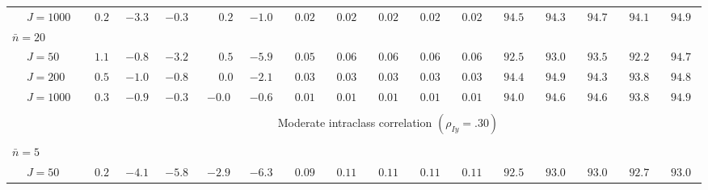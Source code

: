 \begin{sidewaystable}
\begin{threeparttable}
\begin{tabular}{llccccccccccccccc}
 & \nopagebreak $\;J=1000$  & $\phantom{-}0.2\phantom{0}$ & ${-}3.3\phantom{0}$ & ${-}0.3\phantom{0}$ & $\phantom{-}0.2\phantom{0}$ & ${-}1.0\phantom{0}$ & $\phantom{0}0.02\phantom{0}$ & $\phantom{0}0.02\phantom{0}$ & $\phantom{0}0.02\phantom{0}$ & $\phantom{0}0.02\phantom{0}$ & $\phantom{0}0.02\phantom{0}$ & $\phantom{0}94.5\phantom{0}$ & $\phantom{0}94.3\phantom{0}$ & $\phantom{0}94.7\phantom{0}$ & $\phantom{0}94.1\phantom{0}$ & $\phantom{0}94.9\phantom{0}$ \\
\multicolumn{4}{l}{$\bar{n}=20$} \\  & \nopagebreak $\;J=50$  & $\phantom{-}1.1\phantom{0}$ & ${-}0.8\phantom{0}$ & ${-}3.2\phantom{0}$ & $\phantom{-}0.5\phantom{0}$ & ${-}5.9\phantom{0}$ & $\phantom{0}0.05\phantom{0}$ & $\phantom{0}0.06\phantom{0}$ & $\phantom{0}0.06\phantom{0}$ & $\phantom{0}0.06\phantom{0}$ & $\phantom{0}0.06\phantom{0}$ & $\phantom{0}92.5\phantom{0}$ & $\phantom{0}93.0\phantom{0}$ & $\phantom{0}93.5\phantom{0}$ & $\phantom{0}92.2\phantom{0}$ & $\phantom{0}94.7\phantom{0}$ \\
 & \nopagebreak $\;J=200$  & $\phantom{-}0.5\phantom{0}$ & ${-}1.0\phantom{0}$ & ${-}0.8\phantom{0}$ & $\phantom{-}0.0\phantom{0}$ & ${-}2.1\phantom{0}$ & $\phantom{0}0.03\phantom{0}$ & $\phantom{0}0.03\phantom{0}$ & $\phantom{0}0.03\phantom{0}$ & $\phantom{0}0.03\phantom{0}$ & $\phantom{0}0.03\phantom{0}$ & $\phantom{0}94.4\phantom{0}$ & $\phantom{0}94.9\phantom{0}$ & $\phantom{0}94.3\phantom{0}$ & $\phantom{0}93.8\phantom{0}$ & $\phantom{0}94.8\phantom{0}$ \\
 & \nopagebreak $\;J=1000$  & $\phantom{-}0.3\phantom{0}$ & ${-}0.9\phantom{0}$ & ${-}0.3\phantom{0}$ & ${-}0.0\phantom{0}$ & ${-}0.6\phantom{0}$ & $\phantom{0}0.01\phantom{0}$ & $\phantom{0}0.01\phantom{0}$ & $\phantom{0}0.01\phantom{0}$ & $\phantom{0}0.01\phantom{0}$ & $\phantom{0}0.01\phantom{0}$ & $\phantom{0}94.0\phantom{0}$ & $\phantom{0}94.6\phantom{0}$ & $\phantom{0}94.6\phantom{0}$ & $\phantom{0}93.8\phantom{0}$ & $\phantom{0}94.9\phantom{0}$ \\
[0.5ex]\hline\\[-1.6ex] 
& & \multicolumn{15}{c}{Moderate intraclass correlation $(\rho_{Iy}=.30)$} \\[0.6ex]\hline\\[-1.8ex]
\multicolumn{4}{l}{$\bar{n}=5$} \\  & \nopagebreak $\;J=50$  & $\phantom{-}0.2\phantom{0}$ & ${-}4.1\phantom{0}$ & ${-}5.8\phantom{0}$ & ${-}2.9\phantom{0}$ & ${-}6.3\phantom{0}$ & $\phantom{0}0.09\phantom{0}$ & $\phantom{0}0.11\phantom{0}$ & $\phantom{0}0.11\phantom{0}$ & $\phantom{0}0.11\phantom{0}$ & $\phantom{0}0.11\phantom{0}$ & $\phantom{0}92.5\phantom{0}$ & $\phantom{0}93.0\phantom{0}$ & $\phantom{0}93.0\phantom{0}$ & $\phantom{0}92.7\phantom{0}$ & $\phantom{0}93.0\phantom{0}$ \\

\end{tabular}
\end{threeparttable}
\end{sidewaystable}

